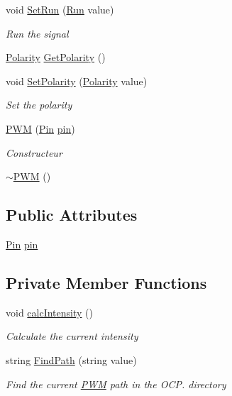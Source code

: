 \begin{DoxyCompactItemize}
\item 
void \hyperlink{class_hardware_1_1_p_w_m_a73b5f0047d4eb62f93f72745124fca73}{Set\+Run} (\hyperlink{class_hardware_1_1_p_w_m_a6f1e614731154a3613c03a4238ddd107}{Run} value)
\begin{DoxyCompactList}\small\item\em Run the signal \end{DoxyCompactList}\item 
\hyperlink{class_hardware_1_1_p_w_m_a728111433109229b4da1efc953a107c1}{Polarity} \hyperlink{class_hardware_1_1_p_w_m_a938dbb560c1dd057193b39a4186bef9c}{Get\+Polarity} ()
\item 
void \hyperlink{class_hardware_1_1_p_w_m_a2fc3f25039bd180daf3af186912c3a29}{Set\+Polarity} (\hyperlink{class_hardware_1_1_p_w_m_a728111433109229b4da1efc953a107c1}{Polarity} value)
\begin{DoxyCompactList}\small\item\em Set the polarity \end{DoxyCompactList}\item 
\hyperlink{class_hardware_1_1_p_w_m_ac5608137ddc798aa26c505ec6edb8458}{P\+W\+M} (\hyperlink{class_hardware_1_1_p_w_m_a7cc6acf1c28f0eaef16246635dc0353a}{Pin} \hyperlink{class_hardware_1_1_p_w_m_a47a155962c7c376bf1fe27c15c1e1e1d}{pin})
\begin{DoxyCompactList}\small\item\em Constructeur \end{DoxyCompactList}\item 
\hyperlink{class_hardware_1_1_p_w_m_a2867d5a260e3b6069926a3282e66ebba}{$\sim$\+P\+W\+M} ()
\end{DoxyCompactItemize}
\subsection*{Public Attributes}
\begin{DoxyCompactItemize}
\item 
\hyperlink{class_hardware_1_1_p_w_m_a7cc6acf1c28f0eaef16246635dc0353a}{Pin} \hyperlink{class_hardware_1_1_p_w_m_a47a155962c7c376bf1fe27c15c1e1e1d}{pin}
\end{DoxyCompactItemize}
\subsection*{Private Member Functions}
\begin{DoxyCompactItemize}
\item 
void \hyperlink{class_hardware_1_1_p_w_m_a891abdbbd00aae4f0a4afdf0a9e3a160}{calc\+Intensity} ()
\begin{DoxyCompactList}\small\item\em Calculate the current intensity \end{DoxyCompactList}\item 
string \hyperlink{class_hardware_1_1_p_w_m_ad826f2fc67d34bc3c6d5fc859c32c1cc}{Find\+Path} (string value)
\begin{DoxyCompactList}\small\item\em Find the current \hyperlink{class_hardware_1_1_p_w_m}{P\+W\+M} path in the O\+C\+P. directory \end{DoxyCompactList}\end{DoxyCompactItemize}
